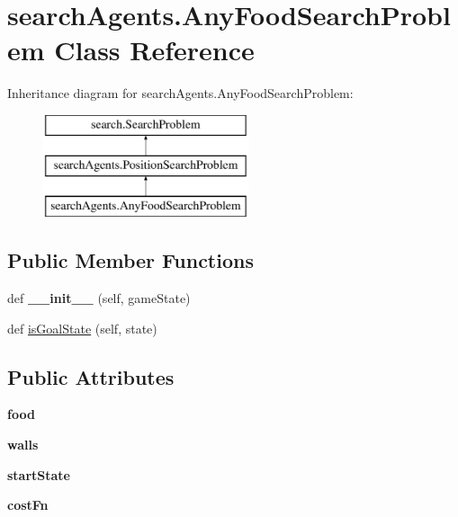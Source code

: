 \hypertarget{classsearch_agents_1_1_any_food_search_problem}{}\section{search\+Agents.\+Any\+Food\+Search\+Problem Class Reference}
\label{classsearch_agents_1_1_any_food_search_problem}
Inheritance diagram for search\+Agents.\+Any\+Food\+Search\+Problem\+:\begin{figure}[H]
\begin{center}
\leavevmode
\includegraphics[height=3.000000cm]{classsearch_agents_1_1_any_food_search_problem}
\end{center}
\end{figure}
\subsection*{Public Member Functions}
\begin{DoxyCompactItemize}
\item 
\mbox{\label{classsearch_agents_1_1_any_food_search_problem_a4d5a1064232c1ea9acb8e9d76580b225}} 
def {\bfseries \+\_\+\+\_\+init\+\_\+\+\_\+} (self, game\+State)
\item 
def \hyperlink{classsearch_agents_1_1_any_food_search_problem_a2b17e2e517592203930d4cc0ca29659a}{is\+Goal\+State} (self, state)
\end{DoxyCompactItemize}
\subsection*{Public Attributes}
\begin{DoxyCompactItemize}
\item 
\mbox{\label{classsearch_agents_1_1_any_food_search_problem_aefcc56a1f0280214c66076fb9f86bc6c}} 
{\bfseries food}
\item 
\mbox{\label{classsearch_agents_1_1_any_food_search_problem_aee38c772c21dd19790c052c6623aa9e8}} 
{\bfseries walls}
\item 
\mbox{\label{classsearch_agents_1_1_any_food_search_problem_a4827bfdcd26355e9f66787338861c8b8}} 
{\bfseries start\+State}
\item 
\mbox{\label{classsearch_agents_1_1_any_food_search_problem_abb374c075dafa0041e75e9f6700e2f93}} 
{\bfseries cost\+Fn}
\end{DoxyCompactItemize}


